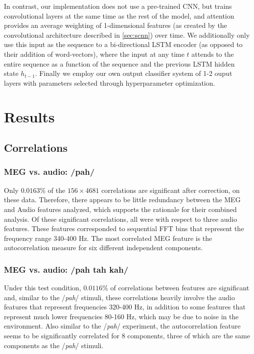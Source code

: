 \documentclass[utf8]{frontiersSCNS} %
\begin{document}
In contrast, our implementation does not use a pre-trained CNN, but trains convolutional layers at the same time as the rest of the model, and attention provides an average weighting of 1-dimensional features (as created by the convolutional architecture described in \ref{sec:scnn}) over time. We additionally only use this input as the sequence to a bi-directional \cite{} LSTM encoder (as opposed to their addition of word-vectors), where the input at any time $t$ attends to the entire sequence as a function of the sequence and the previous LSTM hidden state $h_{t-1}$. Finally we employ our own output classifier system of 1-2 ouput layers with parameters selected through hyperparameter optimization.

\section{Results}

\subsection{Correlations}

\subsubsection{MEG vs. audio: /pah/}

Only $0.0163$\% of the $156 \times 4681$ correlations are significant after correction, on these data. Therefore, there appears to be little redundancy between the MEG and Audio features analyzed, which supports the rationale for their combined analysis. Of these significant correlations, all were with respect to three audio features. These features corresponded to sequential FFT bins that represent the frequency range 340-400 Hz. The most correlated MEG feature is the autocorrelation measure for six different independent components.

\subsubsection{MEG vs. audio: /pah tah kah/}

Under this test condition, $0.0116$\% of correlations between features are significant and, similar to the /{\em pah}/ stimuli, these correlations heavily involve the audio features that represent frequencies 320-400 Hz, in addition to some features that represent much lower frequencies 80-160 Hz, which may be due to noise in the environment. Also similar to the /{\em pah}/ experiment, the autocorrelation feature seems to be significantly correlated for 8 components, three of which are the same components as the /{\em pah}/ stimuli.
\end{document}
